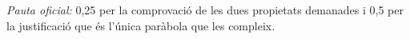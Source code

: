 \begin{apartats}
\begin{solucio}
\textit{Pauta oficial:} 0,25 per la comprovació de les dues propietats demanades i 0,5 per la justificació
que és l'única paràbola que les compleix.
\end{solucio}

\end{apartats}
